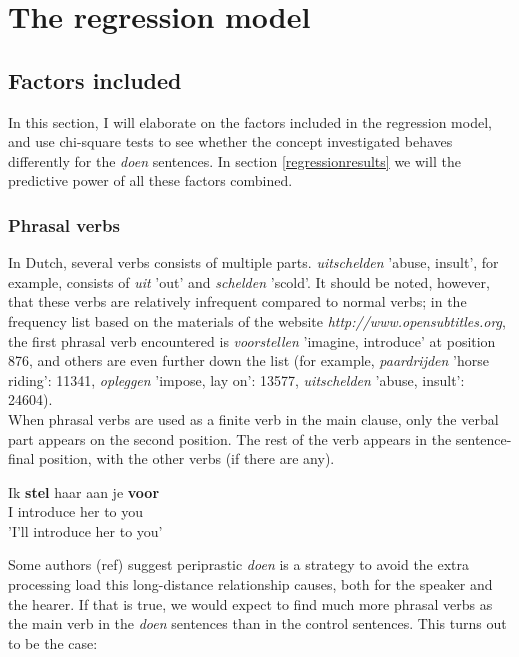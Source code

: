 \documentclass[12pt]{article}
\begin{document}

\section{The regression model} \label{regression}

\subsection{Factors included}

In this section, I will elaborate on the factors included in the regression model, and use chi-square tests to see whether the concept investigated behaves differently for the \emph{doen} sentences. In section \ref{regressionresults} we will the predictive power of all these factors combined.

\subsubsection{Phrasal verbs}
In Dutch, several verbs consists of multiple parts. \emph{uitschelden} 'abuse, insult', for example, consists of \emph{uit} 'out' and \emph{schelden} 'scold'. It should be noted, however, that these verbs are relatively infrequent compared to normal verbs; in the frequency list based on the materials of the website \emph{http://www.opensubtitles.org}, the first phrasal verb encountered is \emph{voorstellen} 'imagine, introduce' at position 876, and others are even further down the list (for example, \emph{paardrijden} 'horse riding': 11341, \emph{opleggen} 'impose, lay on': 13577, \emph{uitschelden} 'abuse, insult': 24604).\\\indent
When phrasal verbs are used as a finite verb in the main clause, only the verbal part appears on the second position. The rest of the verb appears in the sentence-final position, with the other verbs (if there are any).

\begin{exe}
\ex \gll Ik \textbf{stel} haar aan je \textbf{voor}\\
I introduce her to you\\
'I'll introduce her to you'
\end{exe}

Some authors (ref) suggest periprastic \emph{doen} is a strategy to avoid the extra processing load this long-distance relationship causes, both for the speaker and the hearer. If that is true, we would expect to find much more phrasal verbs as the main verb in the \emph{doen} sentences than in the control sentences. This turns out to be the case:
\end{document}
